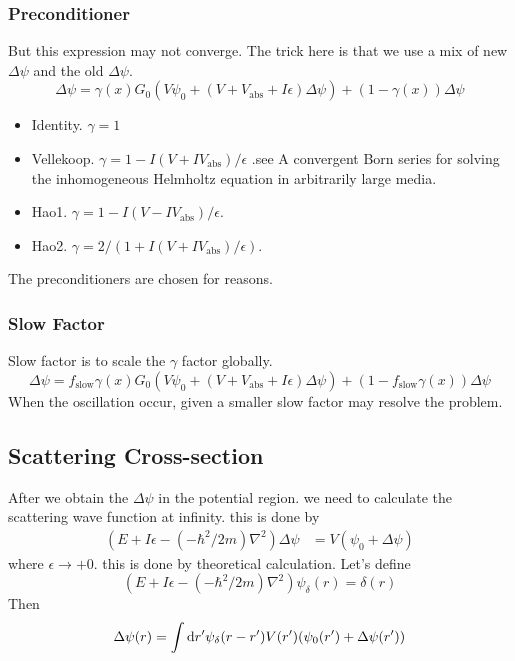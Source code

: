\documentclass[12pt,twoside]{article}
\def\df{{\rm d}}
\begin{document}
\subsubsection{Preconditioner}
But this expression may not converge. The trick here is that we use a mix of new $\Delta \psi$ and the old $\Delta \psi$.
$$\Delta\psi = \gamma(x) G_0(V\psi_0 + (V+V_\text{abs} + I\epsilon)\Delta \psi) + (1-\gamma(x))\Delta \psi$$

\begin{itemize}
  \item Identity. $\gamma=1$
  \item Vellekoop. $\gamma=1 - I (V+IV_\text{abs}) /\epsilon$ .see A convergent Born series for solving the inhomogeneous Helmholtz equation in arbitrarily large media.
  \item Hao1. $\gamma=1 - I (V-IV_\text{abs}) /\epsilon$.
  \item Hao2. $\gamma=2/(1 + I (V+IV_\text{abs}) / \epsilon)$.
\end{itemize}
The preconditioners are chosen for reasons.

\subsubsection{Slow Factor}
Slow factor is to scale the $\gamma$ factor globally.
$$\Delta\psi = f_\text{slow} \gamma(x) G_0(V\psi_0 + (V+V_\text{abs} + I\epsilon)\Delta \psi) + (1- f_\text{slow}\gamma(x))\Delta \psi$$
When the oscillation occur, given a smaller slow factor may resolve the problem.

\subsection{Scattering Cross-section}

After we obtain the $\Delta \psi$ in the potential region. we need to calculate the scattering wave function at infinity. this is done by
\begin{align}
(E + I\epsilon -(-\hbar^2/2m)\nabla^2)\Delta\psi &= V(\psi_0 + \Delta \psi)
\end{align}
where $\epsilon\rightarrow +0$. this is done by theoretical calculation.
Let's define
$$
(E + I\epsilon -(-\hbar^2/2m)\nabla^2)\psi_\delta(r) = \delta(r)
$$
Then
$$
\Delta\psi(r) = \int \df r^\prime \psi_\delta(r-r^\prime) V(r^\prime)(\psi_0(r^\prime) + \Delta\psi(r^\prime))
$$
\end{document}
